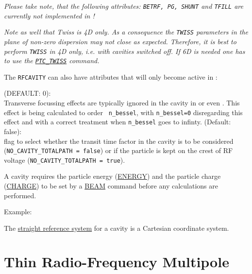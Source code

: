 \textit{ Please take note, that the following \madeight attributes:
  {\tt BETRF, PG, SHUNT} and {\tt TFILL} are currently not implemented in 
  \madx!}    

\textit{ Note as well that Twiss is 4D only. As a consequence
  the {\tt TWISS} parameters in the plane of non-zero dispersion may not
  close as expected. Therefore, it is best to perform {\tt TWISS} in 4D
  only, i.e. with cavities switched off. If 6D is needed one has to
  use the \hyperref[sec:ptc_twiss]{\tt PTC\_TWISS} command. } 

The {\tt RFCAVITY} can also have attributes that will only become active in 
\ptc: 
\begin{madlist}
    (DEFAULT: 0): \\
     Transverse focussing effects are typically ignored in the cavity in
     \madx or even \ptc. This effect is being calculated to order {\tt 
     n\_bessel},
     with {\tt n\_bessel=0} disregarding this effect and with a correct 
     treatment
     when {\tt n\_bessel} goes to infinty.
    (Default: false): \\
     flag to select whether the transit time factor in the cavity is to be
     considered ({\tt NO\_CAVITY\_TOTALPATH = false}) or if the particle is
     kept on the crest of RF voltage ({\tt NO\_CAVITY\_TOTALPATH = true}).  
\end{madlist}

A cavity requires the particle energy (\href{beam.html#energy}{ENERGY})
and the particle charge (\href{beam.html#charge}{CHARGE}) to be set by a
\href{beam.html}{BEAM} command before any calculations are performed.  

 Example: 

The \hyperref[subsec:local_straight]{straight reference system} for a
cavity is a Cartesian coordinate system.  


\section{Thin Radio-Frequency Multipole}
\label{sec:rfmultipole}

